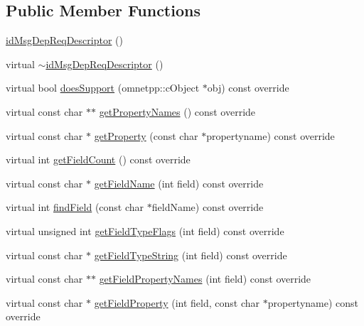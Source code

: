 \subsection*{Public Member Functions}
\begin{DoxyCompactItemize}
\item 
\hyperlink{classidMsgDepReqDescriptor_a2f3ef90d3ded0e3218bbd9577c207dfa}{id\+Msg\+Dep\+Req\+Descriptor} ()
\item 
virtual \hyperlink{classidMsgDepReqDescriptor_aee85d0507fe535a9dd7a5c793d0941ed}{$\sim$id\+Msg\+Dep\+Req\+Descriptor} ()
\item 
virtual bool \hyperlink{classidMsgDepReqDescriptor_a866862bf6ada354e5f85cdd65c57f394}{does\+Support} (omnetpp\+::c\+Object $\ast$obj) const override
\item 
virtual const char $\ast$$\ast$ \hyperlink{classidMsgDepReqDescriptor_a7150bb9f317973c98f118ba004de28cc}{get\+Property\+Names} () const override
\item 
virtual const char $\ast$ \hyperlink{classidMsgDepReqDescriptor_a389f447ccbaba22709ec52b3ed5438f7}{get\+Property} (const char $\ast$propertyname) const override
\item 
virtual int \hyperlink{classidMsgDepReqDescriptor_a36d7503463f93c4422429b63f94ba12e}{get\+Field\+Count} () const override
\item 
virtual const char $\ast$ \hyperlink{classidMsgDepReqDescriptor_a7bb154c4ddb6234b3ada7a80e9d92cb8}{get\+Field\+Name} (int field) const override
\item 
virtual int \hyperlink{classidMsgDepReqDescriptor_afb1d884343c3a15781c749a5d054cd7c}{find\+Field} (const char $\ast$field\+Name) const override
\item 
virtual unsigned int \hyperlink{classidMsgDepReqDescriptor_acb44b456dc185a621c29b37511e58ae8}{get\+Field\+Type\+Flags} (int field) const override
\item 
virtual const char $\ast$ \hyperlink{classidMsgDepReqDescriptor_aadee504ad5a0a6d979364cf1f30b2b39}{get\+Field\+Type\+String} (int field) const override
\item 
virtual const char $\ast$$\ast$ \hyperlink{classidMsgDepReqDescriptor_ab8386cc6ce60e9aa43a48e39029ead08}{get\+Field\+Property\+Names} (int field) const override
\item 
virtual const char $\ast$ \hyperlink{classidMsgDepReqDescriptor_af6ee434f614562190431baafbadc2df6}{get\+Field\+Property} (int field, const char $\ast$propertyname) const override
\item 

\end{DoxyCompactItemize}
